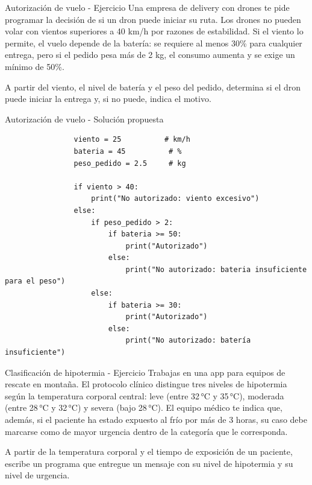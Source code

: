 \documentclass{beamer}
\begin{document}
    \begin{frame}{Autorización de vuelo - Ejercicio}
        Una empresa de delivery con drones te pide programar la decisión de si un dron 
        puede iniciar su ruta. Los drones no pueden volar con vientos superiores a 40 km/h 
        por razones de estabilidad. Si el viento lo permite, el vuelo depende de la batería: 
        se requiere al menos 30\% para cualquier entrega, pero si el pedido pesa más de 2 kg, 
        el consumo aumenta y se exige un mínimo de 50\%.

        A partir del viento, el nivel de batería y el peso del pedido, determina si el dron 
        puede iniciar la entrega y, si no puede, indica el motivo.
    \end{frame}

    \begin{frame}[fragile,t]{Autorización de vuelo - Solución propuesta}
        \begin{verbatim}
                viento = 25          # km/h
                bateria = 45          # %
                peso_pedido = 2.5     # kg

                if viento > 40:
                    print("No autorizado: viento excesivo")
                else:
                    if peso_pedido > 2:
                        if bateria >= 50:
                            print("Autorizado")
                        else:
                            print("No autorizado: bateria insuficiente para el peso")
                    else:
                        if bateria >= 30:
                            print("Autorizado")
                        else:
                            print("No autorizado: batería insuficiente")
        \end{verbatim}
    \end{frame}

    \begin{frame}{Clasificación de hipotermia - Ejercicio}
        Trabajas en una app para equipos de rescate en montaña. El protocolo clínico distingue tres 
        niveles de hipotermia según la temperatura corporal central: leve (entre 32\,°C y 35\,°C), 
        moderada (entre 28\,°C y 32\,°C) y severa (bajo 28\,°C). El equipo médico te indica que, además, 
        si el paciente ha estado expuesto al frío por más de 3 horas, su caso debe marcarse como de 
        mayor urgencia dentro de la categoría que le corresponda.

        A partir de la temperatura corporal y el tiempo de exposición de un paciente, escribe un 
        programa que entregue un mensaje con su nivel de hipotermia y su nivel de urgencia.
    \end{frame}
\end{document}
